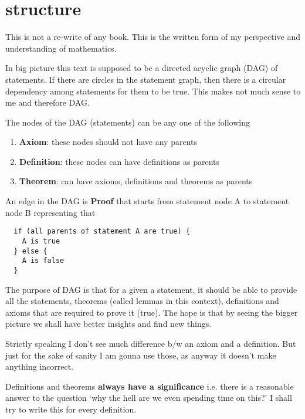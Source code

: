 \documentclass[./main.tex]{subfiles}
\begin{document}
\section{structure}
This is not a re-write of any book.
This is the written form of my perspective and understanding of mathematics.

In big picture this text is supposed to be a directed acyclic graph (DAG) of statements.
If there are circles in the statement graph, then there is a circular dependency among statements for them to be true. This makes not much sense to me and therefore DAG.

The nodes of the DAG (statements) can be any one of the following
\begin{enumerate}
  \item \textbf{Axiom}: these nodes should not have any parents
  \item \textbf{Definition}: these nodes can have definitions as parents
  \item \textbf{Theorem}: can have axioms, definitions and theorems as parents
\end{enumerate}

An edge in the DAG is \textbf{Proof} that starts from statement node A to statement node B representing that
\begin{verbatim}
  if (all parents of statement A are true) {
    A is true
  } else {
    A is false
  }
\end{verbatim}

The purpose of DAG is that for a given a statement, it should be able to provide all the statements, theorems (called lemmas in this context), definitions and axioms that are required to prove it (true). The hope is that by seeing the bigger picture we shall have better insights and find new things.

Strictly speaking I don't see much difference b/w an axiom and a definition.
But just for the sake of sanity I am gonna use those, as anyway it doesn't make anything incorrect.

Definitions and theorems \textbf{always have a significance} i.e. there is a reasonable answer to the question `why the hell are we even spending time on this?' I shall try to write this for every definition.

\pagebreak
\end{document}
